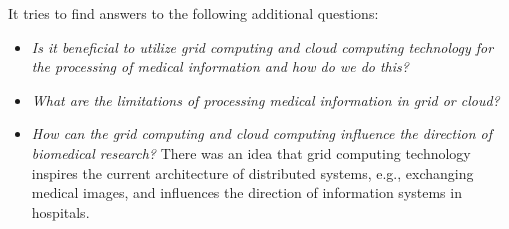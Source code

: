 It tries to find answers to the following additional questions:
\begin{itemize}
\item \emph{Is it beneficial to utilize grid computing and cloud computing technology for the processing of medical information and how do we do this?} %
\item \emph{What are the limitations of processing medical information in grid or cloud?} 
\item \emph{How can the grid computing and cloud computing influence the direction of biomedical research?} There was an idea that grid computing technology inspires the current architecture of distributed systems,  e.g., exchanging medical images, and influences the direction of information systems in hospitals. 
\end{itemize}

